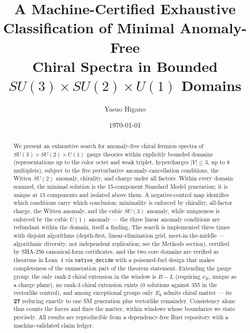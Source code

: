 \documentclass[aps,prd,preprint,nofootinbib]{revtex4-2}
\begin{document}
\title{A Machine-Certified Exhaustive Classification of Minimal Anomaly-Free\\
Chiral Spectra in Bounded $SU(3)\times SU(2)\times U(1)$ Domains}

\author{Yasuo Higano}

\date{\today}

\begin{abstract}
We present an exhaustive search for anomaly-free chiral fermion spectra of
$SU(3)\times SU(2)\times U(1)$ gauge theories within explicitly bounded domains
(representations up to the color octet and weak triplet, hypercharges $|Y|\le 3$,
up to 8 multiplets), subject to the five perturbative anomaly-cancellation
conditions, the Witten $SU(2)$ anomaly, chirality, and charge under all factors.
Within every domain scanned, the minimal solution is the 15-component Standard
Model generation; it is unique at 15 components and isolated above them. A
negative-control map identifies which conditions carry which conclusion:
minimality is enforced by chirality, all-factor charge, the Witten anomaly, and
the cubic $SU(3)$ anomaly, while uniqueness is enforced by the cubic $U(1)$
anomaly --- the three linear anomaly conditions are redundant within the domain,
itself a finding. The search is implemented three times with disjoint
algorithms (depth-first, linear-elimination grid, meet-in-the-middle ---
algorithmic diversity, not independent replication; see the Methods section),
certified by SHA-256
canonical-form certificates, and the two core domains are verified as theorems
in Lean~4 via \texttt{native\_decide} with a poisoned-fuel design that makes
completeness of the enumeration part of the theorem statement. Extending the
gauge group: the only rank-2 chiral extension in the window is $B-L$ (requiring
$\nu_R$, unique as a charge plane), no rank-3 chiral extension exists (0
solutions against 355 in the vectorlike control), and among exceptional groups
only $E_6$ admits chiral matter --- its $\mathbf{27}$ reducing exactly to one SM
generation plus vectorlike remainder. Consistency alone thus counts the forces
and fixes the matter, within windows whose boundaries we state precisely. All
results are reproducible from a dependency-free Rust repository with a
machine-validated claim ledger.
\end{abstract}
\end{document}
